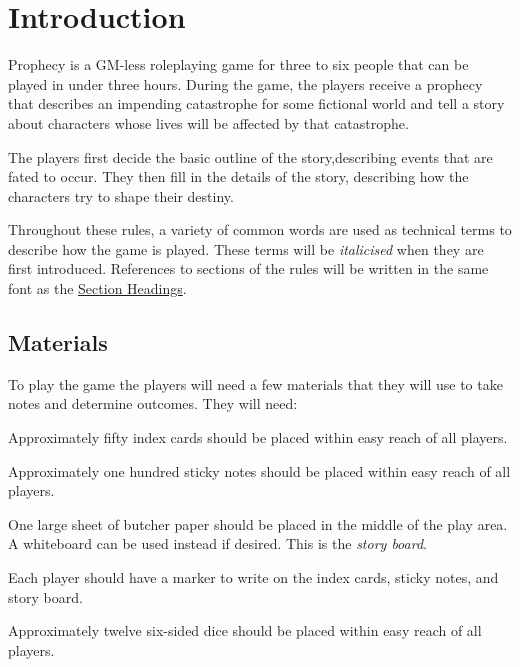 \documentclass[12pt, a5paper, parskip=half-]{scrartcl}
\begin{document}
\section*{Introduction} \label{section:introduction}
Prophecy is a GM-less roleplaying game for three to six people that can be played in under three hours.
During the game, the players receive a prophecy that describes an impending catastrophe for some fictional world and tell a story about characters whose lives will be affected by that catastrophe. 

The players first decide the basic outline of the story,describing events that are fated to occur.  They then fill in the details of the story, describing how the characters try to shape their destiny.

Throughout these rules, a variety of common words are used as technical terms to describe how the game is played.
These terms will be \emph{italicised} when they are first introduced.
References to sections of the rules will be written in the same font as the \hyperref[section:introduction]{\cinzel \small Section Headings}.

\subsection*{Materials} \label{subsection:materials}
To play the game the players will need a few materials that they will use to take notes and determine outcomes. They will need:
\begin{description}[labelindent=0.25cm, leftmargin=\widthof{\hspace{0.25cm}\textbullet\space}, font=\normalfont\textbullet\bfseries\space]
	\item[Index Cards:] Approximately fifty index cards should be placed within easy reach of all players. 
	\item[Sticky Notes:] Approximately one hundred sticky notes should be placed within easy reach of all players.
	\item[Butcher Paper:] One large sheet of butcher paper should be placed in the middle of the play area.  A whiteboard can be used instead if desired. This is the \emph{story board}. 
	\item[Markers:] Each player should have a marker to write on the index cards, sticky notes, and story board.
	\item[Dice:] Approximately twelve six-sided dice should be placed within easy reach of all players. 
\end{description}
\end{document}
